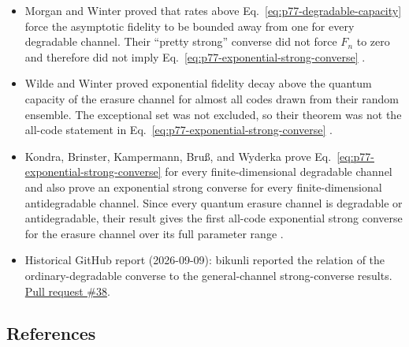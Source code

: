 \begin{itemize}
  \item Morgan and Winter proved that rates above
  Eq.~\eqref{eq:p77-degradable-capacity} force the asymptotic fidelity to be
  bounded away from one for every degradable channel.  Their ``pretty
  strong'' converse did not force $F_n$ to zero and therefore did not imply
  Eq.~\eqref{eq:p77-exponential-strong-converse}
  .

  \item Wilde and Winter proved exponential fidelity decay above the quantum
  capacity of the erasure channel for almost all codes drawn from their
  random ensemble.  The exceptional set was not excluded, so their theorem
  was not the all-code statement in
  Eq.~\eqref{eq:p77-exponential-strong-converse}
  .

  \item Kondra, Brinster, Kampermann, Bru{\ss}, and Wyderka prove
  Eq.~\eqref{eq:p77-exponential-strong-converse} for every finite-dimensional
  degradable channel and also prove an exponential strong converse for every
  finite-dimensional antidegradable channel.  Since every quantum erasure
  channel is degradable or antidegradable, their result gives the first
  all-code exponential strong converse for the erasure channel over its full
  parameter range .

  \item Historical GitHub report (2026-09-09): bikunli reported the relation of the ordinary-degradable converse to the general-channel strong-converse results. \href{https://github.com/Naixu-Guo/quantum-open-problems/pull/38}{Pull request \#38}.
\end{itemize}

\subsection*{References}


